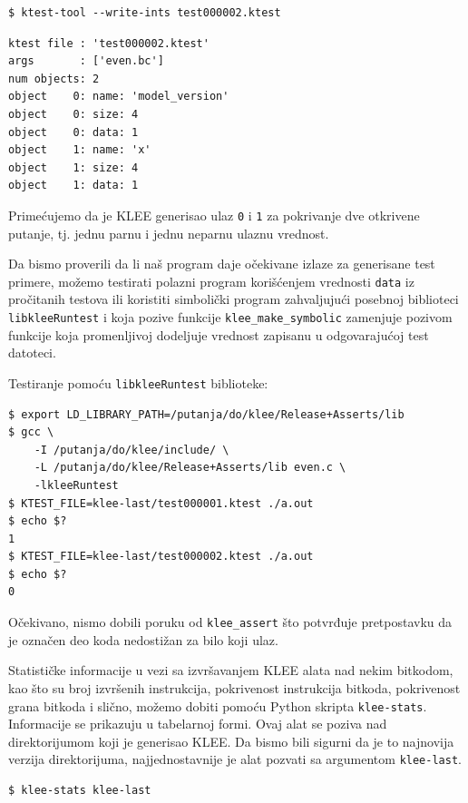 \begin{verbatim}
$ ktest-tool --write-ints test000002.ktest
\end{verbatim}

\begin{verbatim}
ktest file : 'test000002.ktest'
args       : ['even.bc']
num objects: 2
object    0: name: 'model_version'
object    0: size: 4
object    0: data: 1
object    1: name: 'x'
object    1: size: 4
object    1: data: 1
\end{verbatim}

Primećujemo da je KLEE generisao ulaz \texttt{0} i \texttt{1} za pokrivanje dve otkrivene putanje, tj. jednu parnu i jednu neparnu ulaznu vrednost.

Da bismo proverili da li naš program daje očekivane izlaze za generisane test primere, možemo testirati polazni program korišćenjem vrednosti \texttt{data} iz pročitanih testova ili koristiti simbolički program zahvaljujući posebnoj biblioteci \texttt{libkleeRuntest} i koja pozive funkcije \texttt{klee\_make\_symbolic} zamenjuje pozivom funkcije koja promenljivoj dodeljuje vrednost zapisanu u odgovarajućoj test datoteci.

Testiranje pomoću \texttt{libkleeRuntest} biblioteke:

\begin{verbatim}
$ export LD_LIBRARY_PATH=/putanja/do/klee/Release+Asserts/lib
$ gcc \
    -I /putanja/do/klee/include/ \
    -L /putanja/do/klee/Release+Asserts/lib even.c \
    -lkleeRuntest
$ KTEST_FILE=klee-last/test000001.ktest ./a.out
$ echo $?
1
$ KTEST_FILE=klee-last/test000002.ktest ./a.out
$ echo $?
0
\end{verbatim}

Očekivano, nismo dobili poruku od \texttt{klee\_assert} što potvrđuje pretpostavku da je označen deo koda nedostižan za bilo koji ulaz.

Statističke informacije u vezi sa izvršavanjem KLEE alata nad nekim bitkodom, kao što su broj izvršenih instrukcija, pokrivenost instrukcija bitkoda, pokrivenost grana bitkoda i slično, možemo dobiti pomoću Python skripta \texttt{klee-stats}. Informacije se prikazuju u tabelarnoj formi. Ovaj alat se poziva nad direktorijumom koji je generisao KLEE. Da bismo bili sigurni da je to najnovija verzija direktorijuma, najjednostavnije je alat pozvati sa argumentom \texttt{klee-last}.

\begin{verbatim}
$ klee-stats klee-last
\end{verbatim}

